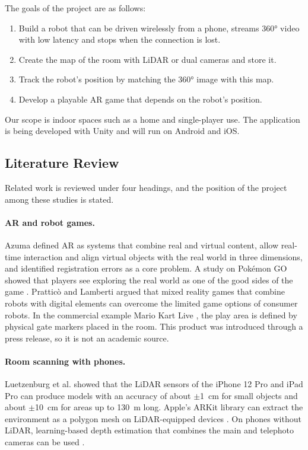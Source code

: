 \documentclass[11pt,a4paper]{article}
\begin{document}
The goals of the project are as follows:
\begin{enumerate}[label=G\arabic*.]
  \item Build a robot that can be driven wirelessly from a phone, streams 360° video with low latency and stops when the connection is lost.
  \item Create the map of the room with LiDAR or dual cameras and store it.
  \item Track the robot's position by matching the 360° image with this map.
  \item Develop a playable AR game that depends on the robot's position.
\end{enumerate}
Our scope is indoor spaces such as a home and single-player use. The application is being developed with Unity and will run on Android and iOS.

\subsection{Literature Review}
\label{subsec:literatur}
Related work is reviewed under four headings, and the position of the project among these studies is stated.

\paragraph{AR and robot games.}
Azuma \cite{azuma1997survey} defined AR as systems that combine real and virtual content, allow real-time interaction and align virtual objects with the real world in three dimensions, and identified registration errors as a core problem. A study on Pokémon GO showed that players see exploring the real world as one of the good sides of the game \cite{paavilainen2017pokemon}. Pratticò and Lamberti \cite{prattico2021mixed} argued that mixed reality games that combine robots with digital elements can overcome the limited game options of consumer robots. In the commercial example Mario Kart Live \cite{mariokartlive2020}, the play area is defined by physical gate markers placed in the room. This product was introduced through a press release, so it is not an academic source.

\paragraph{Room scanning with phones.}
Luetzenburg et al. \cite{luetzenburg2021iphone} showed that the LiDAR sensors of the iPhone 12 Pro and iPad Pro can produce models with an accuracy of about $\pm$1~cm for small objects and about $\pm$10~cm for areas up to 130~m long. Apple's ARKit library can extract the environment as a polygon mesh on LiDAR-equipped devices \cite{apple2026arkit}. On phones without LiDAR, learning-based depth estimation that combines the main and telephoto cameras can be used \cite{zhang2020dunet}.
\end{document}
